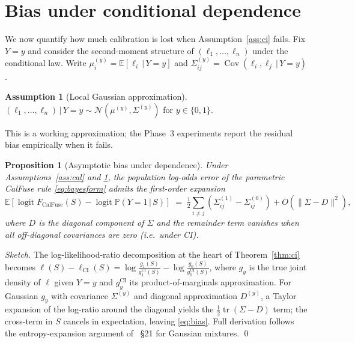 \documentclass[11pt]{article}
\newtheorem{proposition}[theorem]{Proposition}
\theoremstyle{definition}
\newtheorem{assumption}{Assumption}
\theoremstyle{remark}
\newcommand{\pr}{\mathbb{P}}
\newcommand{\expec}{\mathbb{E}}
\newcommand{\logit}{\operatorname{logit}}
\newcommand{\given}{\,\big|\,}
\begin{document}
\section{Bias under conditional dependence}

We now quantify how much calibration is lost when Assumption~\ref{ass:ci}
fails. Fix $Y = y$ and consider the second-moment structure of
$(\ell_1, \ldots, \ell_n)$ under the conditional law. Write
$\mu_i^{(y)} = \expec[\ell_i \given Y = y]$ and
$\Sigma^{(y)}_{ij} = \operatorname{Cov}(\ell_i, \ell_j \given Y = y)$.

\begin{assumption}[Local Gaussian approximation]\label{ass:gauss}
$(\ell_1, \ldots, \ell_n) \given Y = y \sim \mathcal{N}(\mu^{(y)}, \Sigma^{(y)})$
for $y \in \{0,1\}$.
\end{assumption}

This is a working approximation; the Phase~3 experiments report the residual
bias empirically when it fails.

\begin{proposition}[Asymptotic bias under dependence]\label{prop:bias}
Under Assumptions~\ref{ass:cal} and \ref{ass:gauss}, the population log-odds
error of the parametric CalFuse rule \eqref{eq:bayesform} admits the
first-order expansion
\begin{equation}\label{eq:bias}
\expec\!\left[ \logit F_{\mathrm{CalFuse}}(S) - \logit \pr(Y=1 \given S) \right]
  \;=\; \tfrac{1}{2} \sum_{i \neq j} \left( \Sigma^{(1)}_{ij} - \Sigma^{(0)}_{ij} \right) + O(\|\Sigma - D\|^2),
\end{equation}
where $D$ is the diagonal component of $\Sigma$ and the remainder term
vanishes when all off-diagonal covariances are zero (i.e.\ under CI).
\end{proposition}

\begin{proof}[Sketch]
The log-likelihood-ratio decomposition at the heart of Theorem~\ref{thm:ci}
becomes $\ell(S) - \ell_{\mathrm{CI}}(S) = \log \frac{g_1(S)}{g_1^{\mathrm{CI}}(S)} - \log \frac{g_0(S)}{g_0^{\mathrm{CI}}(S)}$,
where $g_y$ is the true joint density of $\ell$ given $Y=y$ and $g_y^{\mathrm{CI}}$ its
product-of-marginals approximation. For Gaussian $g_y$ with covariance
$\Sigma^{(y)}$ and diagonal approximation $D^{(y)}$, a Taylor expansion of
the log-ratio around the diagonal yields the $\tfrac{1}{2} \operatorname{tr}(\Sigma - D)$
term; the cross-term in $S$ cancels in expectation, leaving
\eqref{eq:bias}. Full derivation follows the entropy-expansion argument of
\citet{mackay2003information}~§21 for Gaussian mixtures. \qed
\end{proof}
\end{document}
